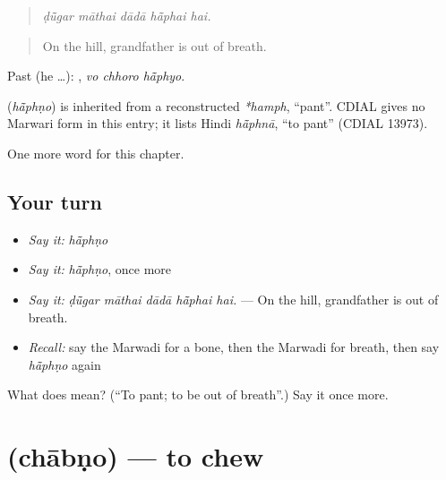 \begin{quote}
    
\end{quote}

\begin{quote}
\emph{ḍū̃gar māthai dādā hā̃phai hai.}
\end{quote}

\begin{quote}
On the hill, grandfather is out of breath.
\end{quote}

Past (he …):   , \emph{vo chhoro hā̃phyo}.

\begin{cousinweb}
\textbf{} (\emph{hā̃phṇo}) is inherited from a reconstructed \emph{*hamph}, \textquotedblleft{}pant\textquotedblright{}. CDIAL gives no Marwari form in this entry; it lists Hindi \emph{hā̃phnā}, \textquotedblleft{}to pant\textquotedblright{} (CDIAL 13973).
\end{cousinweb}

\begin{grammarlens}[title={What you've built}]
One more word for this chapter.
\end{grammarlens}

\subsection*{Your turn}
\begin{itemize}
\raggedright
  \item \emph{Say it:} \emph{hā̃phṇo}
  \item \emph{Say it:} \emph{hā̃phṇo}, once more
  \item \emph{Say it:} \emph{ḍū̃gar māthai dādā hā̃phai hai.} — On the hill, grandfather is out of breath.
  \item \emph{Recall:} say the Marwadi for a bone, then the Marwadi for breath, then say \emph{hā̃phṇo} again
\end{itemize}

\begin{tcolorbox}[breakable,colback=teal!4,colframe=teal!35!black,title={Before you move on}]
What does  mean? (\textquotedblleft{}To pant; to be out of breath\textquotedblright{}.) Say it once more.
\end{tcolorbox}
\section[\texorpdfstring{\mw{चाबणो} (chābṇo)}{चाबणो (chābṇo)}]{ (chābṇo) — to chew}

